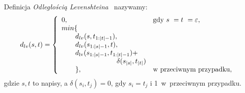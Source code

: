 \documentclass[11pt,pdftex,mathserif]{beamer}
\theoremstyle{definition}
\begin{document}
\begin{frame}
\begin{block}{Definicja}
\emph{Odległością Levenshteina}~\cite{Levenshtein1965:binarycodes} nazywamy:
$$
d_{lv}(s, t) = \left\{
\begin{array}{l l}     
    0, & \text{gdy } s~= t~= \varepsilon,\\
    min\{ & \\
\qquad    d_{lv}(s, t_{1:|t|-1}), & \\
\qquad    d_{lv}(s_{1:|s|-1}, t), & \\
\qquad    d_{\mathrm{lv}}(s_{1:|s|-1}, t_{1:|t|-1}) +\\  
\qquad\qquad\qquad\qquad     \delta(s_{|s|}, t_{|t|}) & \\
\qquad    \}, & \text{w przeciwnym przypadku},
\end{array}\right.
$$
gdzie $s, t$ to napisy, a $\delta(s_{i}, t_{j}) = 0$, gdy $s_i = t_j$ i 1~w~przeciwnym przypadku. 
\end{block}
\end{frame}

%
%
%
\end{document}

